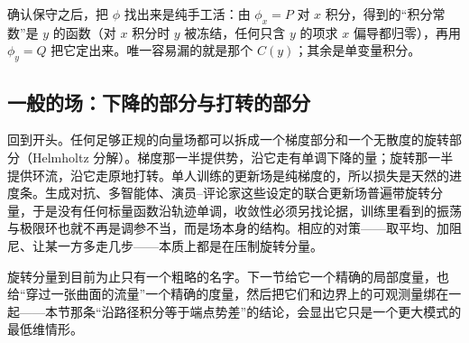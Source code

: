 确认保守之后，把 \(\phi\) 找出来是纯手工活：由 \(\phi_x=P\) 对 \(x\) 积分，得到的``积分常数''是 \(y\) 的函数（对 \(x\) 积分时 \(y\) 被冻结，任何只含 \(y\) 的项求 \(x\) 偏导都归零），再用 \(\phi_y=Q\) 把它定出来。唯一容易漏的就是那个 \(C(y)\)；其余是单变量积分。

\subsection{一般的场：下降的部分与打转的部分}

回到开头。任何足够正规的向量场都可以拆成一个梯度部分和一个无散度的旋转部分（Helmholtz 分解）。梯度那一半提供势，沿它走有单调下降的量；旋转那一半提供环流，沿它走原地打转。单人训练的更新场是纯梯度的，所以损失是天然的进度条。生成对抗、多智能体、演员--评论家这些设定的联合更新场普遍带旋转分量，于是没有任何标量函数沿轨迹单调，收敛性必须另找论据，训练里看到的振荡与极限环也就不再是调参不当，而是场本身的结构。相应的对策——取平均、加阻尼、让某一方多走几步——本质上都是在压制旋转分量。

旋转分量到目前为止只有一个粗略的名字。下一节给它一个精确的局部度量，也给``穿过一张曲面的流量''一个精确的度量，然后把它们和边界上的可观测量绑在一起——本节那条``沿路径积分等于端点势差''的结论，会显出它只是一个更大模式的最低维情形。
